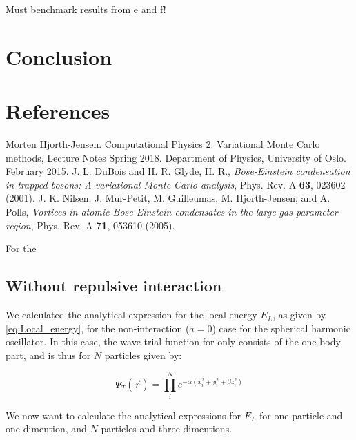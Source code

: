 \documentclass[norsk,a4paper,12pt]{article}
\begin{document}
Must benchmark results from e and f!


\section{Conclusion}

\newpage
\section{References}
\begingroup
\renewcommand{\section}[2]{}
\begin{thebibliography}{}
	Morten Hjorth-Jensen.
	Computational Physics 2: Variational Monte Carlo methods, Lecture Notes Spring 2018.
	Department of Physics, University of Oslo.
	February 2015.
	J. L. DuBois and H. R. Glyde, H. R., \emph{Bose-Einstein condensation in trapped bosons: A variational Monte Carlo analysis}, Phys. Rev. A \textbf{63}, 023602 (2001).
	J. K. Nilsen,  J. Mur-Petit, M. Guilleumas, M. Hjorth-Jensen, and A. Polls, \emph{Vortices in atomic Bose-Einstein condensates in the large-gas-parameter region}, Phys. Rev. A \textbf{71}, 053610 (2005).
\end{thebibliography}
\endgroup

\newpage

\section*{Appendix A} \label{appendix_A}

For the 
\subsection{Without repulsive interaction}
We calculated the analytical expression for the local energy $E_L$, as given by \ref{eq:Local_energy}, for the non-interaction ($a=0$) case for the spherical harmonic oscillator. In this case, the wave trial function for only consists of the one body part, and is thus for $N$ particles given by:

\begin{equation}
	\label{eq:WF_nointeract}
	\Psi_T(\vec{r}) = \prod_i^N e^{-\alpha(x_i^2 + y_i^2 + \beta z_i^2)}
\end{equation}

We now want to calculate the analytical expressions for $E_L$ for one particle and one dimention, and $N$ particles and three dimentions.
\end{document}

